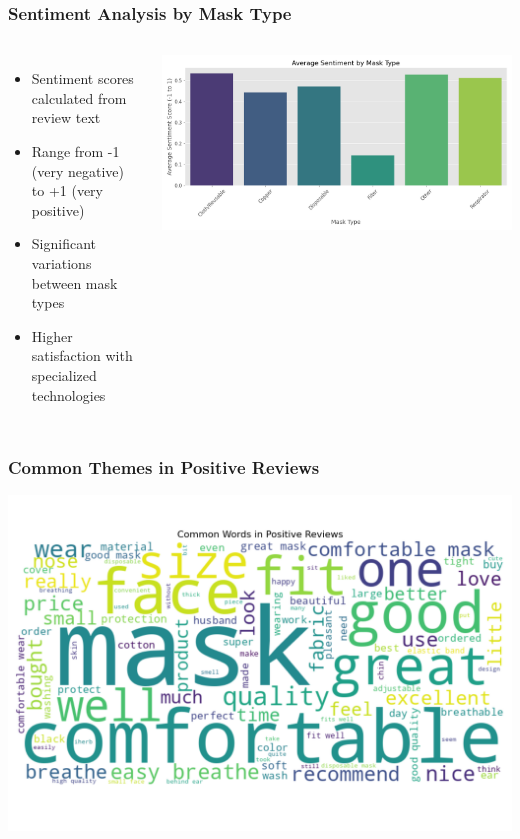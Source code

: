 \documentclass[aspectratio=169]{beamer}
\begin{document}
\begin{frame}
\frametitle{Sentiment Analysis by Mask Type}
\begin{columns}
\begin{itemize}
    \item Sentiment scores calculated from review text
    \item Range from -1 (very negative) to +1 (very positive)
    \item Significant variations between mask types
    \item Higher satisfaction with specialized technologies
\end{itemize}
\includegraphics[width=\textwidth]{plots/sentiment_by_mask_type.png}
\end{columns}
\end{frame}

\begin{frame}
\frametitle{Common Themes in Positive Reviews}
\centering
\includegraphics[height=0.8\textheight]{plots/positive_reviews_wordcloud.png}
\end{frame}
\end{document}

